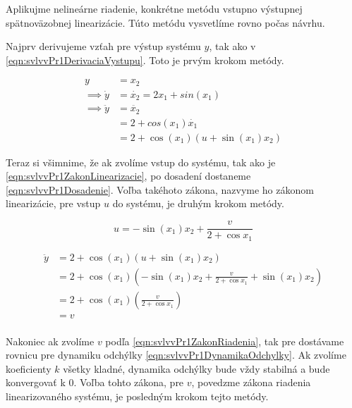 	Aplikujme nelineárne riadenie, konkrétne metódu vstupno výstupnej spätnoväzobnej linearizácie. Túto metódu vysvetlíme rovno počas návrhu. 
	
	Najprv derivujeme vzťah pre výstup systému $y$, tak ako v \cref{eqn:svlvvPr1DerivaciaVystupu}. Toto je prvým krokom metódy.
	
	\begin{equation}
	\begin{aligned}
		y &= x_2 \\ 
		\implies \dot{y}  &= \dot{x_2} =  2x_1 + sin(x_1) \\
		\implies \ddot{y} &= \ddot{x_2} \\
						  &= 2 + cos(x_1)\dot{x_1} \\
						  &= 2 + \cos(x_1)(u + \sin(x_1) x_2)
		\end{aligned}
		\label{eqn:svlvvPr1DerivaciaVystupu}
	\end{equation}
	
	Teraz si všimnime, že ak zvolíme vstup do systému, tak ako je \cref{eqn:svlvvPr1ZakonLinearizacie}, po dosadení dostaneme \cref{eqn:svlvvPr1Dosadenie}. Voľba takéhoto zákona, nazvyme ho zákonom linearizácie, pre vstup $u$ do systému, je druhým krokom metódy.
	
	\begin{equation}
	 u = -\sin(x_1) x_2  +  \frac{v}{2 + \cos x_1}
	 \label{eqn:svlvvPr1ZakonLinearizacie}
	\end{equation}
	
	\begin{equation}
	\begin{aligned}
	 	\ddot{y} &= 2 + \cos(x_1)(u + \sin(x_1) x_2) \\
	 		     &= 2 + \cos(x_1)(-\sin(x_1) x_2  +  \frac{v}{2 + \cos x_1} + \sin(x_1) x_2)  \\ 
	 		     &= 2 + \cos(x_1)(\frac{v}{2 + \cos x_1})  \\ 
	 		     &= v  \\ 
 	\end{aligned}
	\label{eqn:svlvvPr1Dosadenie}
	\end{equation}
	
	Nakoniec ak zvolíme $v$ podľa \cref{eqn:svlvvPr1ZakonRiadenia}, tak pre dostávame rovnicu pre dynamiku odchýlky \cref{eqn:svlvvPr1DynamikaOdchylky}. Ak zvolíme koeficienty $k$ všetky kladné, dynamika odchýlky bude vždy stabilná a bude konvergovať k 0. Voľba tohto zákona, pre $v$, povedzme zákona riadenia linearizovaného systému, je posledným krokom tejto metódy.
	
